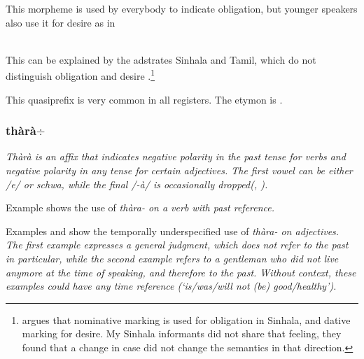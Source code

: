 This morpheme is used by everybody to indicate obligation, but younger speakers also use it for desire as in 


 \\
This can be explained by the adstrates Sinhala and Tamil, which do not distinguish obligation and desire \citep[84]{Lehmann1989}.\footnote{\citet[12]{Karunatillake2004} argues that nominative marking is used for obligation in Sinhala, and dative marking for desire. My Sinhala informants did not share that feeling, they found that a change in case did not change the semantics in that direction.}

This quasiprefix is very common in all registers.
The etymon  is  \citep{SmithEtAl2004,SmithEtAl2007}.
% 




\subsubsection{thàrà$\div$}\label{sec:morph:thara-}
\em Thàrà \em is an affix that indicates negative polarity in the past tense for verbs and negative polarity in any tense for certain adjectives. The first vowel can be either /e/ or schwa, while the final /-à/ is occasionally dropped(\citet[cf.][26]{Adelaar1991}, \citet[cf.][141]{Slomanson2007cll}).

Example  shows the use of \em thàra- \em on a verb with past reference.


Examples  and   show the temporally underspecified use of \em thàra- \em on adjectives. The first example expresses a general judgment, which does not refer to the past in particular, while the second example refers to a gentleman who did not live anymore at the time of speaking, and therefore to the past. Without context, these examples could have any time reference (`is/was/will not (be) good/healthy').


